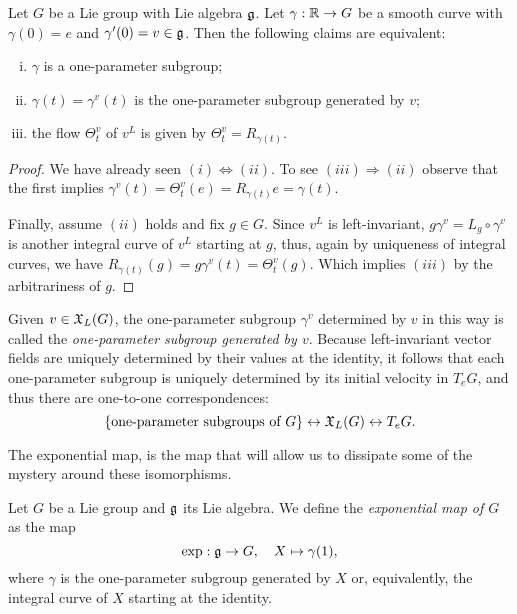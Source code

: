 \begin{proposition}\label{prop:liflow}
  Let $G$ be a Lie group with Lie algebra $\mathfrak{g}$.
  Let $\gamma:\mathbb{R}\to G$ be a smooth curve with $\gamma(0)=e$ and $\gamma'(0)=v\in\mathfrak{g}$. Then the following claims are equivalent:
  \begin{enumerate}[(i)]
    \item $\gamma$ is a one-parameter subgroup;
    \item $\gamma(t) = \gamma^v(t)$ is the one-parameter subgroup generated by $v$;
    \item the flow $\Theta_t^v$ of $v^L$ is given by $\Theta_t^v = R_{\gamma(t)}$.
  \end{enumerate}
\end{proposition}
\begin{proof}
  We have already seen $(i) \Leftrightarrow (ii)$.
  To see $(iii)\Rightarrow(ii)$ observe that the first implies $\gamma^v(t) = \Theta_t^v(e) = R_{\gamma(t)}e = \gamma(t)$.
  
  Finally, assume $(ii)$ holds and fix $g\in G$.
  Since $v^L$ is left-invariant, $g\gamma^v = L_g \circ \gamma^v$ is another integral curve of $v^L$ starting at $g$, thus, again by uniqueness of integral curves, we have $R_{\gamma(t)}(g) = g\gamma^v(t) = \Theta_t^v(g)$. Which implies $(iii)$ by the arbitrariness of $g$.
\end{proof}

Given $v\in\mathfrak{X}_L(G)$, the one-parameter subgroup $\gamma^v$ determined by $v$ in this way is called the \emph{one-parameter subgroup generated by $v$}.
Because left-invariant vector fields are uniquely determined by their values at the identity, it follows that each one-parameter subgroup is uniquely determined by its initial velocity in $T_eG$, and thus there are one-to-one correspondences:
\begin{equation}
  \{\mbox{one-parameter subgroups of }G\}
  \leftrightarrow
  \mathfrak{X}_L(G)
  \leftrightarrow
  T_e G.
\end{equation}

The exponential map, is the map that will allow us to dissipate some of the mystery around these isomorphisms.

\begin{definition}
  Let $G$ be a Lie group and $\mathfrak{g}$ its Lie algebra.
  We define the \emph{exponential map of $G$} as the map
  \begin{equation}
    \exp: \mathfrak{g} \to G , \quad X \mapsto \gamma(1),
  \end{equation}
  where $\gamma$ is the one-parameter subgroup generated by $X$ or, equivalently, the integral curve of $X$ starting at the identity.
\end{definition}

